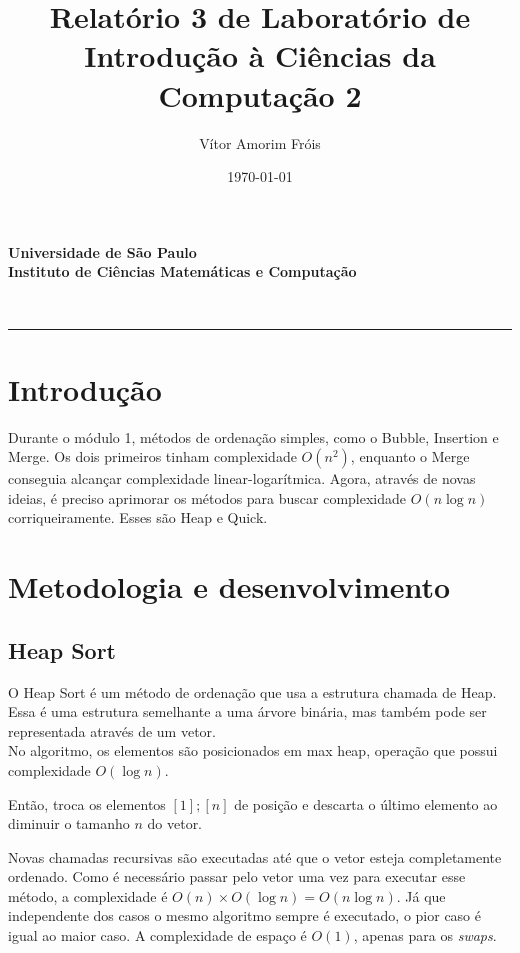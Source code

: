 \documentclass[fontsize=11pt]{article}
\title{
\Large{Relatório 3 de Laboratório de Introdução à Ciências da Computação 2}\\
[10pt] 
}
\author{Vítor Amorim Fróis}
\date{\today}
\makeatletter
\renewenvironment{abstract} %
  {\small
  \begin{center}
  \bfseries \abstractname\vspace{-.5em}\vspace{0pt}
  \end{center}
  \list{}{%
    \setlength{\leftmargin}{0mm}
    \setlength{\rightmargin}{\leftmargin}%
  }
  \item\relax}
 {\endlist}
\renewcommand{\maketitle}{\bgroup\setlength{\parindent}{0pt}%
\begin{center}
    \textbf{
      Universidade de São Paulo\\
      Instituto de Ciências Matemáticas e Computação
    }
\end{center}
\begin{flushleft}
  \textbf{\@title}
  \@author\\
  [3pt] 
  \@date
\end{flushleft}\egroup
}
\makeatother
\begin{document}
\maketitle

\begin{abstract}

\end{abstract}

\rule{\linewidth}{0.2pt}

\section{Introdução}
    Durante o módulo 1, métodos de ordenação simples, como o Bubble, Insertion
    e Merge. Os dois primeiros tinham complexidade $O(n^2)$, enquanto o Merge 
    conseguia alcançar complexidade linear-logarítmica.
    Agora, através de novas ideias, é preciso aprimorar os métodos para buscar
    complexidade $O(n\log n)$ corriqueiramente. Esses são Heap e Quick. 

\section{Metodologia e desenvolvimento}
  \subsection{Heap Sort}
    O Heap Sort é um método de ordenação que usa a estrutura chamada de Heap.
    Essa é uma estrutura semelhante a uma árvore binária, mas também pode ser 
    representada através de um vetor. 
    \\ No algoritmo, os elementos são posicionados em max heap, operação que possui 
    complexidade $O(\log n)$. 
    
    Então, troca os elementos $[1];[n]$ de posição e descarta
    o último elemento ao diminuir o tamanho $n$ do vetor. 
    
    Novas chamadas 
    recursivas são executadas até que o vetor esteja completamente ordenado.
    Como é necessário passar pelo vetor uma vez para executar esse método,
    a complexidade é $O(n) \times O(\log n) = O(n\log n)$.
    Já que independente dos casos o mesmo algoritmo sempre é executado, 
    o pior caso é igual ao maior caso.
    A complexidade de espaço é $O(1)$, apenas para os \textit{swaps}.
\end{document}
